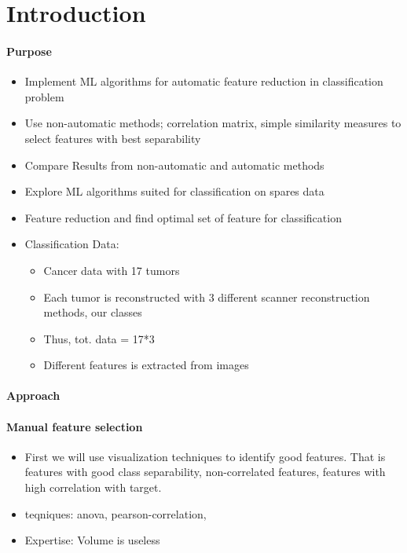 \section{Introduction}




\paragraph{Purpose} 
\begin{itemize}
    \item Implement ML algorithms for automatic feature reduction in classification
        problem
    \item Use non-automatic methods; correlation matrix, simple similarity
        measures to select features with best separability   

    \item Compare Results from non-automatic and automatic methods
\end{itemize}



\begin{itemize}
    \item Explore ML algorithms suited for classification on spares data  
    \item Feature reduction and find optimal set of feature for classification
    \item Classification Data: 
        \begin{itemize}
            \item Cancer data with 17 tumors
            \item Each tumor is reconstructed with 3 different scanner
                reconstruction methods, our classes 
            \item Thus, tot. data = 17*3
            \item Different features is extracted from images   
        \end{itemize}
        
\end{itemize}


\paragraph{Approach} 
\paragraph{Manual feature selection} 
\begin{itemize}
    \item First we will use visualization techniques to identify good features.
        That is features with good class separability, non-correlated features,
        features with high correlation with target. 
    \item teqniques: anova, pearson-correlation, 
    \item Expertise: Volume is useless
\end{itemize}

